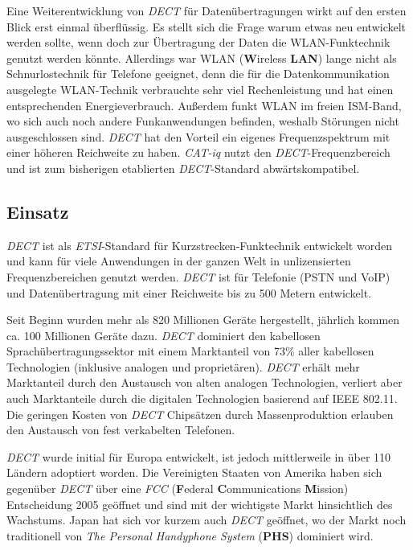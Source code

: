 \begin{multicols}{3}
Eine Weiterentwicklung von \textit{DECT} für Datenübertragungen wirkt auf den ersten Blick erst einmal überflüssig. Es stellt sich die Frage warum etwas neu entwickelt werden sollte, wenn doch zur Übertragung der Daten die WLAN-Funktechnik genutzt werden könnte. Allerdings war WLAN (\textbf{W}ireless \textbf{LAN}) lange nicht als Schnurlostechnik für Telefone geeignet, denn die für die Datenkommunikation ausgelegte WLAN-Technik verbrauchte sehr viel Rechenleistung und hat einen entsprechenden Energieverbrauch. Außerdem funkt WLAN im freien ISM-Band, wo sich auch noch andere Funkanwendungen befinden, weshalb Störungen nicht ausgeschlossen sind. \textit{DECT} hat den Vorteil ein eigenes Frequenzspektrum mit einer höheren Reichweite zu haben. \textit{CAT-iq} nutzt den \textit{DECT}-Frequenzbereich und ist zum bisherigen etablierten \textit{DECT}-Standard abwärtskompatibel. \cite{dect.3}

\subsection*{Einsatz}
\textit{DECT} ist als \textit{ETSI}-Standard für Kurzstrecken-Funktechnik entwickelt worden und kann für viele Anwendungen in der ganzen Welt in unlizensierten Frequenzbereichen genutzt werden. \textit{DECT} ist für Telefonie (PSTN und VoIP) und Datenübertragung mit einer Reichweite bis zu 500 Metern entwickelt.

Seit Beginn wurden mehr als 820 Millionen Geräte hergestellt, jährlich kommen ca. 100 Millionen Geräte dazu. \textit{DECT} dominiert den kabellosen Sprachübertragungssektor mit einem Marktanteil von 73\% aller kabellosen Technologien (inklusive analogen und proprietären). \textit{DECT} erhält mehr Marktanteil durch den Austausch von alten analogen Technologien, verliert aber auch Marktanteile durch die digitalen Technologien basierend auf IEEE 802.11. Die geringen Kosten von \textit{DECT} Chipsätzen durch Massenproduktion erlauben den Austausch von fest verkabelten Telefonen.

\textit{DECT} wurde initial für Europa entwickelt, ist jedoch mittlerweile in über 110 Ländern adoptiert worden. Die Vereinigten Staaten von Amerika haben sich gegenüber \textit{DECT} über eine \textit{FCC} (\textbf{F}ederal \textbf{C}ommunications \textbf{M}ission) Entscheidung 2005 geöffnet und sind mit der wichtigste Markt hinsichtlich des Wachstums. Japan hat sich vor kurzem auch \textit{DECT} geöffnet, wo der Markt noch traditionell von \textit{The Personal Handyphone System} (\textbf{PHS}) dominiert wird.


\end{multicols}
